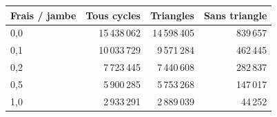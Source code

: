 \begin{tabular}{@{}lrrr@{}}
\toprule
Frais / jambe & Tous cycles & Triangles & Sans triangle\\
\midrule
0,0 & 15\,438\,062 & 14\,598\,405 & 839\,657\\
0,1 & 10\,033\,729 & 9\,571\,284 & 462\,445\\
0,2 & 7\,723\,445 & 7\,440\,608 & 282\,837\\
0,5 & 5\,900\,285 & 5\,753\,268 & 147\,017\\
1,0 & 2\,933\,291 & 2\,889\,039 & 44\,252\\
\bottomrule
\end{tabular}

